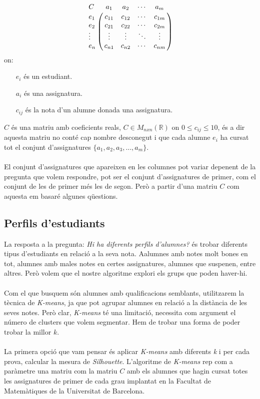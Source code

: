 \documentclass[12pt,a4paper,catalan]{article}
\begin{document}
$$
\bordermatrix{C &         a_1   &    a_2   &   \cdots    &    a_m  \cr
                  e_1    &  c_{11}  &  c_{12}  &   \cdots    &  c_{1m} \cr
                  e_2    &  c_{21}  &  c_{22}  &   \cdots    &  c_{2m}    \cr
                  \vdots &  \vdots  &  \vdots  &   \ddots    &  \vdots \cr
                  e_n    &  c_{n1}  &  c_{n2}  &   \cdots    &  c_{nm} \cr
                  }
$$
on:
\begin{itemize}[leftmargin=.5in]
	\item [$e_i$] és un estudiant.
	\item [$a_i$] és una assignatura.
	\item [$c_{ij}$] és la nota d'un alumne donada una assignatura.
\end{itemize}

$C$ és una matriu amb coeficients reals, $C\in M_{nxn} (\mathbb{R})$ on $0 \leq c_{ij} \leq 10$, és a dir aquesta matriu no conté cap nombre desconegut i que cada alumne $e_i$ ha cursat tot el conjunt d'assignatures $\{a_1, a_2, a_3, \ldots, a_m\}$.
\\
\\
El conjunt d'assignatures que apareixen en les columnes pot variar depenent de la pregunta que volem respondre, pot ser el conjunt d'assignatures de primer, com el conjunt de les de primer més les de segon. Però a partir d'una matriu $C$ com aquesta em basaré algunes qüestions.

\newpage

\subsection{Perfils d'estudiants}
La resposta a la pregunta: \textit{Hi ha diferents perfils d'alumnes?} és trobar diferents tipus d'estudiants en relació a la seva nota. Aalumnes amb notes molt bones en tot, alumnes amb males notes en certes assignatures, alumnes que suspenen, entre altres. Però volem que el nostre algoritme explori els grups que poden haver-hi.
\\
\\
Com el que busquem són alumnes amb qualificacions semblants, utilitzarem la tècnica de \textit{K-means}, ja que pot agrupar alumnes en relació a la distància de les seves notes. Però clar, \textit{K-means} té una limitació, necessita com argument el número de clusters que volem segmentar. Hem de trobar una forma de poder trobar la millor $k$.
\\
\\
La primera opció que vam pensar és aplicar \textit{K-means} amb diferents \textit{k} i per cada prova, calcular la mesura de \textit{Silhouette}. L'algoritme de \textit{K-means} rep com a paràmetre una matriu com la matriu $C$ amb els alumnes que hagin cursat totes les assignatures de primer de cada grau implantat en la Facultat de Matemàtiques de la Universitat de Barcelona. 
\end{document}
